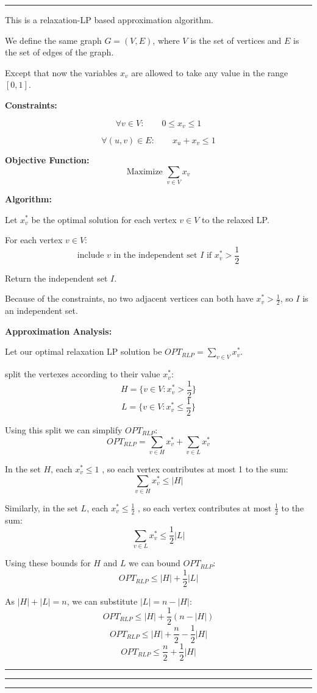 \documentclass[11pt, english]{article}
\newenvironment{answer}{%
  \par\noindent\hrule %
  \vspace{0.25\baselineskip}%
  \noindent{\Large\bfseries Answer}\par\vspace{0.25\baselineskip}\noindent\ignorespaces
}{%
  \par\vspace{0.5\baselineskip}%
  \noindent\hrule\vspace{0.5\baselineskip}%
  \hrule\hrule
}
\begin{document}
\begin{answer}

This is a relaxation-LP based approximation algorithm.

We define the same graph \( G = (V, E) \), where \( V \) is the set of vertices and \( E \) is the set of edges of the graph.

Except that now the variables \( x_v \) are allowed to take any value in the range \([0, 1]\).

\textbf{Constraints:}

\[\forall v \in V : \qquad 0 \leq x_v \leq 1\]

\[\forall (u, v) \in E : \qquad x_u + x_v \leq 1\]

\textbf{Objective Function:}
\[\text{Maximize } \sum_{v \in V} x_v\]



\textbf{Algorithm:}

Let \( x^*_v \) be the optimal solution for each vertex \( v \in V \) to the relaxed LP.

For each vertex \( v \in V \):
\[
\text{include } v \text{ in the independent set } I \text{ if } x_v^* > \frac{1}{2}
\]

Return the independent set \( I \).

Because of the constraints, no two adjacent vertices can both have \( x_v^* > \frac{1}{2} \), so \( I \) is an independent set.

\textbf{Approximation Analysis:}

Let our optimal relaxation LP solution be $OPT_{RLP} = \sum_{v \in V} x_v^*$.

split the vertexes according to their value \( x_v^* \):
\[H = \{ v \in V : x_v^* > \frac{1}{2} \}\]
\[L = \{ v \in V : x_v^* \leq \frac{1}{2} \}\]

Using this split we can simplify $OPT_{RLP}$:
\[OPT_{RLP} = \sum_{v \in H} x_v^* + \sum_{v \in L} x_v^*\]

In the set \( H \), each $x_v^* \leq 1$ , so each vertex contributes at most 1 to the sum:
\[\sum_{v \in H} x_v^* \leq |H|\]

Similarly, in the set \( L \), each $x_v^* \leq \frac{1}{2}$ , so each vertex contributes at most \( \frac{1}{2} \) to the sum:
\[\sum_{v \in L} x_v^* \leq \frac{1}{2} |L|\]

Using these bounds for $H$ and $L$ we can bound $OPT_{RLP}$:
\[OPT_{RLP} \leq |H| + \frac{1}{2} |L|\]

As \( |H| + |L| = n \), we can substitute \( |L| = n - |H| \):
\[OPT_{RLP} \leq |H| + \frac{1}{2} (n - |H|)\]
\[OPT_{RLP} \leq |H| + \frac{n}{2} - \frac{1}{2} |H|\]
\[OPT_{RLP} \leq \frac{n}{2} + \frac{1}{2} |H|\]


\end{answer}
\end{document}
